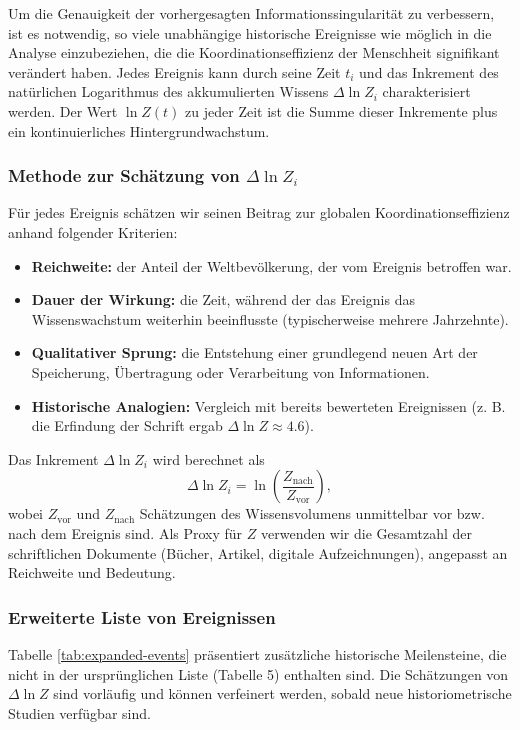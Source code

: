 \documentclass[12pt,a4paper]{article}
\theoremstyle{remark}
\begin{document}
	Um die Genauigkeit der vorhergesagten Informationssingularität zu verbessern, ist es notwendig, so viele unabhängige historische Ereignisse wie möglich in die Analyse einzubeziehen, die die Koordinationseffizienz der Menschheit signifikant verändert haben. Jedes Ereignis kann durch seine Zeit $t_i$ und das Inkrement des natürlichen Logarithmus des akkumulierten Wissens $\Delta \ln Z_i$ charakterisiert werden. Der Wert $\ln Z(t)$ zu jeder Zeit ist die Summe dieser Inkremente plus ein kontinuierliches Hintergrundwachstum.
	
	\subsubsection{Methode zur Schätzung von $\Delta \ln Z_i$}
	
	Für jedes Ereignis schätzen wir seinen Beitrag zur globalen Koordinationseffizienz anhand folgender Kriterien:
	\begin{itemize}
		\item \textbf{Reichweite:} der Anteil der Weltbevölkerung, der vom Ereignis betroffen war.
		\item \textbf{Dauer der Wirkung:} die Zeit, während der das Ereignis das Wissenswachstum weiterhin beeinflusste (typischerweise mehrere Jahrzehnte).
		\item \textbf{Qualitativer Sprung:} die Entstehung einer grundlegend neuen Art der Speicherung, Übertragung oder Verarbeitung von Informationen.
		\item \textbf{Historische Analogien:} Vergleich mit bereits bewerteten Ereignissen (z. B. die Erfindung der Schrift ergab $\Delta \ln Z \approx 4.6$).
	\end{itemize}
	Das Inkrement $\Delta \ln Z_i$ wird berechnet als
	\[
	\Delta \ln Z_i = \ln\left(\frac{Z_{\text{nach}}}{Z_{\text{vor}}}\right),
	\]
	wobei $Z_{\text{vor}}$ und $Z_{\text{nach}}$ Schätzungen des Wissensvolumens unmittelbar vor bzw. nach dem Ereignis sind. Als Proxy für $Z$ verwenden wir die Gesamtzahl der schriftlichen Dokumente (Bücher, Artikel, digitale Aufzeichnungen), angepasst an Reichweite und Bedeutung.
	
	\subsubsection{Erweiterte Liste von Ereignissen}
	
	Tabelle \ref{tab:expanded-events} präsentiert zusätzliche historische Meilensteine, die nicht in der ursprünglichen Liste (Tabelle 5) enthalten sind. Die Schätzungen von $\Delta \ln Z$ sind vorläufig und können verfeinert werden, sobald neue historiometrische Studien verfügbar sind.
	
\end{document}
